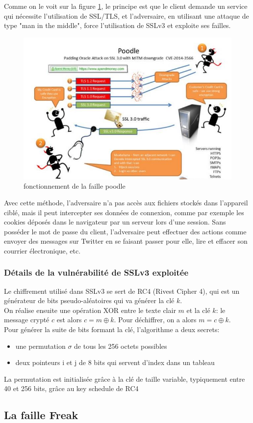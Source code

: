 Comme on le voit sur la figure \ref{poodle}, le principe est que le client demande un service qui nécessite l'utilisation de SSL/TLS, et l'adversaire, en utilisant une attaque de type "man in the middle", force l'utilisation de SSLv3 et exploite ses failles.

\begin{figure}[H]
\includegraphics[scale=0.8]{img/poodle.jpg}
\caption{fonctionnement de la faille poodle}
\label{poodle}
\end{figure}

Avec cette méthode, l'adversaire n’a pas accès aux fichiers stockés dans l’appareil ciblé, mais il peut intercepter ses données de connexion, comme par exemple les cookies déposés dans le navigateur par un serveur lors d’une session. Sans posséder le mot de passe du client, l'adversaire peut effectuer des actions comme envoyer des messages sur Twitter en se faisant passer pour elle, lire et effacer son courrier électronique, etc.

\subsubsection{Détails de la vulnérabilité de SSLv3 exploitée}

Le chiffrement utilisé dans SSLv3 se sert de RC4 (Rivest Cipher 4), qui est un générateur de bits pseudo-aléatoires qui va générer la clé $k$. \\
On réalise ensuite une opération XOR entre le texte clair $m$ et la clé $k$: le message crypté $c$ est alors $c = m \oplus k$. Pour déchiffrer, on a alors $m = c \oplus k$. \\
Pour générer la suite de bits formant la clé, l'algorithme a deux secrets:
\begin{itemize}
  \item une permutation $\sigma$ de tous les 256 octets possibles
  \item deux pointeurs i et j de 8 bits qui servent d'index dans un tableau
\end{itemize}
La permutation est initialisée grâce à la clé de taille variable, typiquement entre 40 et 256 bits, grâce au key schedule de RC4


\subsection{La faille Freak}


